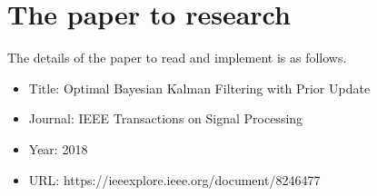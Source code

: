 \section{The paper to research}

The details of the paper\cite{Dehghannasiri2018} to read and implement is as follows.

\begin{itemize}
    \item Title: Optimal Bayesian Kalman Filtering with Prior Update
    \item Journal: IEEE Transactions on Signal Processing
    \item Year: 2018
    \item URL: https://ieeexplore.ieee.org/document/8246477
\end{itemize}


